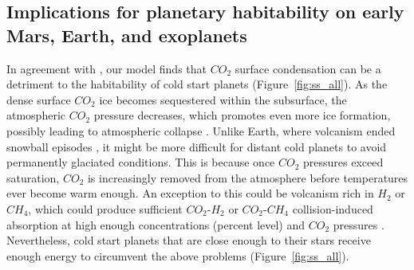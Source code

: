 \documentclass[fleqn,usenatbib]{mnras}
\providecommand{\DIFadd}[1]{{\bf #1}} %
\providecommand{\DIFdel}[1]{} %
\providecommand{\DIFaddbegin}{} %
\providecommand{\DIFaddend}{} %
\providecommand{\DIFdelbegin}{} %
\providecommand{\DIFdelend}{} %
\newcommand{\DIFscaledelfig}{0.5}
\newlength{\DIFdelgraphicswidth} %
\newlength{\DIFdelgraphicsheight} %
\newcommand{\DIFaddincludegraphics}[2][]{{\color{blue}\fbox{\DIFOincludegraphics[#1]{#2}}}} %
\newcommand{\DIFdelincludegraphics}[2][]{%
\sbox{\DIFdelgraphicsbox}{\DIFOincludegraphics[#1]{#2}}%
\settoboxwidth{\DIFdelgraphicswidth}{\DIFdelgraphicsbox} %
\settoboxtotalheight{\DIFdelgraphicsheight}{\DIFdelgraphicsbox} %
\scalebox{\DIFscaledelfig}{%
\parbox[b]{\DIFdelgraphicswidth}{\usebox{\DIFdelgraphicsbox}\\[-\baselineskip] \rule{\DIFdelgraphicswidth}{0em}}\llap{\resizebox{\DIFdelgraphicswidth}{\DIFdelgraphicsheight}{%
\setlength{\unitlength}{\DIFdelgraphicswidth}%
\begin{picture}(1,1)%
\thicklines\linethickness{2pt} %
{\color[rgb]{1,0,0}\put(0,0){\framebox(1,1){}}}%
{\color[rgb]{1,0,0}\put(0,0){\line( 1,1){1}}}%
{\color[rgb]{1,0,0}\put(0,1){\line(1,-1){1}}}%
\end{picture}%
}\hspace*{3pt}}} %
} %
\DeclareRobustCommand{\DIFaddbegin}{\DIFOaddbegin \let\includegraphics\DIFaddincludegraphics} %
\DeclareRobustCommand{\DIFaddend}{\DIFOaddend \let\includegraphics\DIFOincludegraphics} %
\DeclareRobustCommand{\DIFdelbegin}{\DIFOdelbegin \let\includegraphics\DIFdelincludegraphics} %
\DeclareRobustCommand{\DIFdelend}{\DIFOaddend \let\includegraphics\DIFOincludegraphics} %
\begin{document}
\subsection{Implications for planetary habitability on early Mars, Earth, and exoplanets}

In agreement with \citet{Turbet2017}, our model \DIFdelbegin \DIFdel{also }\DIFdelend finds that $CO_{\mathrm{2}}$ surface condensation can be a detriment to the habitability of cold start planets (Figure~\ref{fig:ss_all}). As the dense surface $CO_{\mathrm{2}}$ ice becomes sequestered within the subsurface, the atmospheric $CO_{\mathrm{2}}$ pressure decreases, which promotes even more ice formation, possibly leading to atmospheric collapse \citep{Turbet2017}. Unlike Earth, where volcanism ended snowball episodes \citep{Hoffman1342}, it might be more difficult for distant cold planets to avoid permanently glaciated conditions. This is because once $CO_{\mathrm{2}}$ pressures exceed saturation, $CO_{\mathrm{2}}$ is increasingly removed from the atmosphere before temperatures ever become warm enough. An exception to this could be volcanism rich in $H_{\mathrm{2}}$ or $CH_{\mathrm{4}}$, which could produce sufficient $CO_{\mathrm{2}}$-$H_{\mathrm{2}}$ or $CO_{\mathrm{2}}$-$CH_{\mathrm{4}}$ collision-induced absorption at high enough concentrations (percent level) and $CO_{\mathrm{2}}$ pressures \DIFdelbegin \DIFdel{\citep{ramirez2014,ramirez2017,ramirezkalt2018}}\DIFdelend \DIFaddbegin \DIFadd{\citep{ramirez2014,wordsworth_transient_2017,ramirez2017,ramirezkalt2018,turbet_far_2019}}\DIFaddend . Nevertheless, cold start planets that are close enough to their stars receive enough energy to circumvent the above problems (Figure~\ref{fig:ss_all}). 
\end{document}
